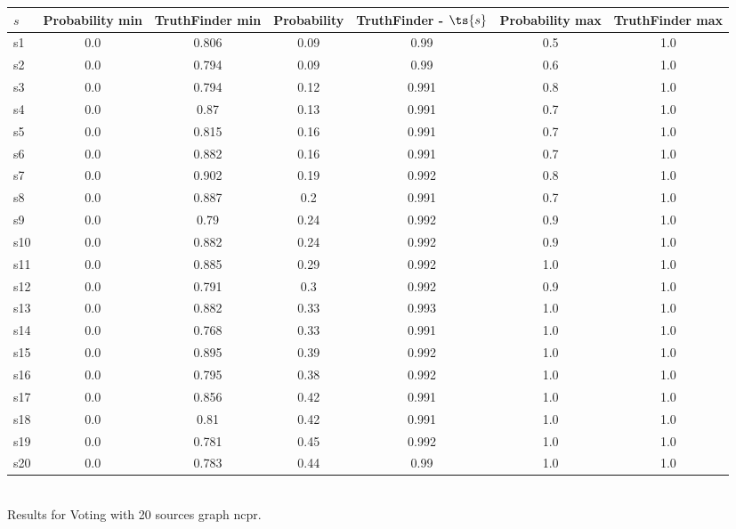 \documentclass{article}
\begin{document}
\noindent\begin{tabular}{|l|c|c|c|c|c|c|}
\hline
$s$& Probability min & TruthFinder min & Probability & TruthFinder - $\ts{s}$ & Probability max & TruthFinder max\\
\hline
s1 &0.0 & 0.806 & 0.09 & 0.99 & 0.5 & 1.0\\
\hline
s2 &0.0 & 0.794 & 0.09 & 0.99 & 0.6 & 1.0\\
\hline
s3 &0.0 & 0.794 & 0.12 & 0.991 & 0.8 & 1.0\\
\hline
s4 &0.0 & 0.87 & 0.13 & 0.991 & 0.7 & 1.0\\
\hline
s5 &0.0 & 0.815 & 0.16 & 0.991 & 0.7 & 1.0\\
\hline
s6 &0.0 & 0.882 & 0.16 & 0.991 & 0.7 & 1.0\\
\hline
s7 &0.0 & 0.902 & 0.19 & 0.992 & 0.8 & 1.0\\
\hline
s8 &0.0 & 0.887 & 0.2 & 0.991 & 0.7 & 1.0\\
\hline
s9 &0.0 & 0.79 & 0.24 & 0.992 & 0.9 & 1.0\\
\hline
s10 &0.0 & 0.882 & 0.24 & 0.992 & 0.9 & 1.0\\
\hline
s11 &0.0 & 0.885 & 0.29 & 0.992 & 1.0 & 1.0\\
\hline
s12 &0.0 & 0.791 & 0.3 & 0.992 & 0.9 & 1.0\\
\hline
s13 &0.0 & 0.882 & 0.33 & 0.993 & 1.0 & 1.0\\
\hline
s14 &0.0 & 0.768 & 0.33 & 0.991 & 1.0 & 1.0\\
\hline
s15 &0.0 & 0.895 & 0.39 & 0.992 & 1.0 & 1.0\\
\hline
s16 &0.0 & 0.795 & 0.38 & 0.992 & 1.0 & 1.0\\
\hline
s17 &0.0 & 0.856 & 0.42 & 0.991 & 1.0 & 1.0\\
\hline
s18 &0.0 & 0.81 & 0.42 & 0.991 & 1.0 & 1.0\\
\hline
s19 &0.0 & 0.781 & 0.45 & 0.992 & 1.0 & 1.0\\
\hline
s20 &0.0 & 0.783 & 0.44 & 0.99 & 1.0 & 1.0\\
\hline
\end{tabular}\\

\noindent Results for Voting with 20 sources graph ncpr.
\end{document}
